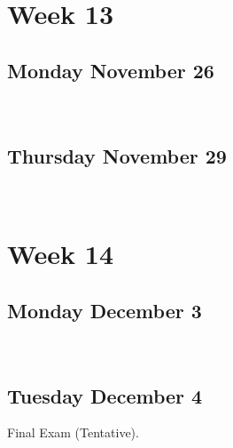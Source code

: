 \documentclass[]{book}
\let\originaltabular\tabular
\let\endoriginaltabular\endtabular
\renewenvironment{tabular}[1]{%
  \begingroup%
  \centering%
  \originaltabular{#1}}%
  {\endoriginaltabular\endgroup}
\theoremstyle{definition}
\theoremstyle{definition}
\theoremstyle{definition}
\theoremstyle{remark}
\begin{document}
\section{Week 13}\label{week-13}

\subsection{Monday November 26}\label{monday-november-26}

\begin{table}[H]
\centering
\begin{tabular}{l}
\hline
\\
\hline
\end{tabular}
\end{table}

\subsection{Thursday November 29}\label{thursday-november-29}

\begin{table}[H]
\centering
\begin{tabular}{l}
\hline
\\
\hline
\end{tabular}
\end{table}

\section{Week 14}\label{week-14}

\subsection{Monday December 3}\label{monday-december-3}

\begin{table}[H]
\centering
\begin{tabular}{l}
\hline
\\
\hline
\end{tabular}
\end{table}

\subsection{Tuesday December 4}\label{tuesday-december-4}

\begin{table}[H]
\centering
\begin{tabular}{l}
\hline
Final Exam (Tentative).\\
\hline
\end{tabular}
\end{table}
\end{document}
